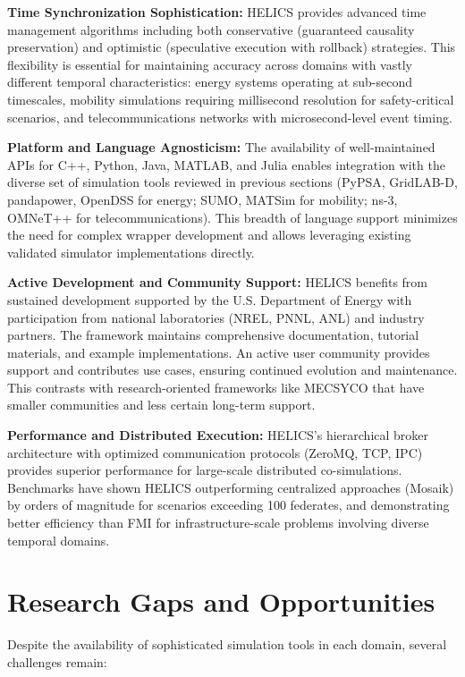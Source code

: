 \textbf{Time Synchronization Sophistication:} HELICS provides advanced time management algorithms including both conservative (guaranteed causality preservation) and optimistic (speculative execution with rollback) strategies. This flexibility is essential for maintaining accuracy across domains with vastly different temporal characteristics: energy systems operating at sub-second timescales, mobility simulations requiring millisecond resolution for safety-critical scenarios, and telecommunications networks with microsecond-level event timing.

\textbf{Platform and Language Agnosticism:} The availability of well-maintained APIs for C++, Python, Java, MATLAB, and Julia enables integration with the diverse set of simulation tools reviewed in previous sections (PyPSA, GridLAB-D, pandapower, OpenDSS for energy; SUMO, MATSim for mobility; ns-3, OMNeT++ for telecommunications). This breadth of language support minimizes the need for complex wrapper development and allows leveraging existing validated simulator implementations directly.

\textbf{Active Development and Community Support:} HELICS benefits from sustained development supported by the U.S. Department of Energy with participation from national laboratories (NREL, PNNL, ANL) and industry partners. The framework maintains comprehensive documentation, tutorial materials, and example implementations. An active user community provides support and contributes use cases, ensuring continued evolution and maintenance. This contrasts with research-oriented frameworks like MECSYCO that have smaller communities and less certain long-term support.

\textbf{Performance and Distributed Execution:} HELICS's hierarchical broker architecture with optimized communication protocols (ZeroMQ, TCP, IPC) provides superior performance for large-scale distributed co-simulations. Benchmarks have shown HELICS outperforming centralized approaches (Mosaik) by orders of magnitude for scenarios exceeding 100 federates, and demonstrating better efficiency than FMI for infrastructure-scale problems involving diverse temporal domains.


\section{Research Gaps and Opportunities}

Despite the availability of sophisticated simulation tools in each domain, several challenges remain:

